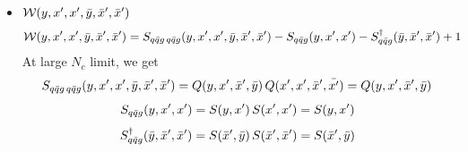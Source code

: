 \documentclass[9pt]{article}
\numberwithin{equation}{section}
\begin{document}
\begin{itemize}
\item $\mathcal{W}(y,x',x',\Bar{y},\Bar{x}',\Bar{x}')$
    \begin{align}
        \mathcal{W}(y,x',x',\Bar{y},\Bar{x}',\Bar{x}') & = S_{q\Bar{q}g\,q\Bar{q}g}(y,x',x',\Bar{y},\Bar{x}',\Bar{x}') -S_{q\Bar{q}g}(y,x',x') - S^{\dagger}_{q\Bar{q}g}(\Bar{y},\Bar{x}',\Bar{x}') + 1
    \end{align}
At large $N_{c}$ limit, we get
$$S_{q\Bar{q}g\,q\Bar{q}g}(y,x',x',\Bar{y},\Bar{x}',\Bar{x}') = Q(y,x',\Bar{x}',\Bar{y})\, Q(x',x',\Bar{x}',\Bar{x'}) = Q(y,x',\Bar{x}',\Bar{y}) $$
$$S_{q\Bar{q}g}(y,x',x') = S(y,x')\, S(x',x') = S(y,x')$$
$$S^{\dagger}_{q\Bar{q}g}(\Bar{y},\Bar{x}',\Bar{x}') = S(\Bar{x}',\Bar{y})\, S(\Bar{x}',\Bar{x}') = S(\Bar{x}',\Bar{y})$$ 
\end{itemize}
\end{document}

